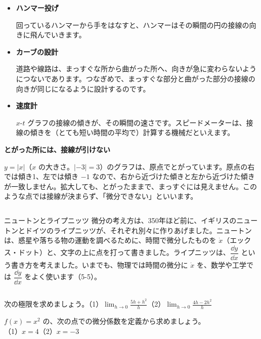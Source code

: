 \begin{butsuri}
\begin{itemize}[leftmargin=1.2\zw, itemsep=2pt, topsep=0pt, label={\color{bkPurple}●}]
\item \textbf{ハンマー投げ}\par
回っているハンマーから手をはなすと、ハンマーはその瞬間の円の接線の向きに飛んでいきます。
\item \textbf{カーブの設計}\par
道路や線路は、まっすぐな所から曲がった所へ、向きが急に変わらないようにつないであります。つなぎめで、まっすぐな部分と曲がった部分の接線の向きが同じになるように設計するのです。
\item \textbf{速度計}\par
$x$-$t$ グラフの接線の傾きが、その瞬間の速さです。スピードメーターは、接線の傾きを（とても短い時間の平均で）計算する機械だといえます。
\end{itemize}
\end{butsuri}

\begin{motto}[3]
\textbf{とがった所には、接線が引けない}\par
$y=|x|$（$x$ の大きさ。$|{-3}|=3$）のグラフは、原点でとがっています。原点の右では傾き1、左では傾き $-1$ なので、右から近づけた傾きと左から近づけた傾きが一致しません。拡大しても、とがったままで、まっすぐには見えません。このような点では接線が決まらず、「微分できない」といいます。
\end{motto}

\begin{column}{ニュートンとライプニッツ}
微分の考え方は、350年ほど前に、イギリスのニュートンとドイツのライプニッツが、それぞれ別々に作りあげました。ニュートンは、惑星や落ちる物の運動を調べるために、時間で微分したものを $\dot{x}$（エックス・ドット）と、文字の上に点を打って書きました。ライプニッツは、$\dfrac{\dd y}{\dd x}$ という書き方を考えました。いまでも、物理では時間の微分に $\dot{x}$ を、数学や工学では $\dfrac{\dd y}{\dd x}$ をよく使います（5-5）。
\end{column}

\bkendproblems
{}

\bkproblem 次の極限を求めましょう。\quad（1）$\displaystyle\lim_{h\to0}\frac{5h+h^2}{h}$\quad（2）$\displaystyle\lim_{h\to0}\frac{4h-2h^2}{h}$

\bkproblem $f(x)=x^2$ の、次の点での微分係数を定義から求めましょう。\\（1）$x=4$\quad（2）$x=-3$

